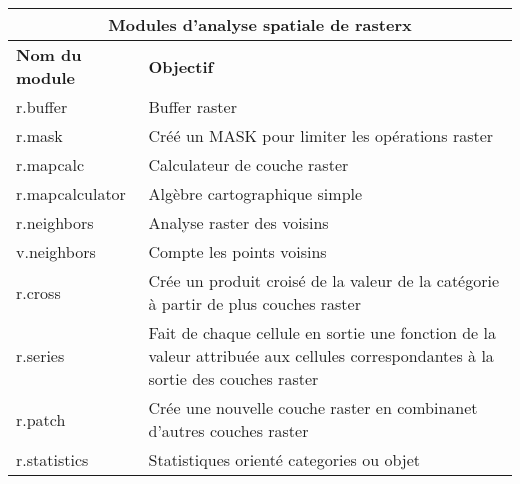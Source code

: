 \begin{table}[H]
\centering
 \begin{tabular}{|p{4cm}|p{10cm}|}
  \hline \multicolumn{2}{|c|}{\textbf{Modules d'analyse spatiale de rasterx}} \\
  \hline \textbf{Nom du module} & \textbf{Objectif} \\
  \hline r.buffer & Buffer raster\\
  \hline r.mask & Créé un MASK pour limiter les opérations raster\\
  \hline r.mapcalc & Calculateur de couche raster \\
  \hline r.mapcalculator & Algèbre cartographique simple \\
  \hline r.neighbors & Analyse raster des voisins\\
  \hline v.neighbors & Compte les points voisins \\
  \hline r.cross & Crée un produit croisé de la valeur de la catégorie à partir de plus couches raster \\
  \hline r.series & Fait de chaque cellule en sortie une fonction de la valeur attribuée aux cellules correspondantes à la sortie des couches raster\\
  \hline r.patch & Crée une nouvelle couche raster en combinanet d'autres couches raster \\
  \hline r.statistics & Statistiques orienté categories ou objet\\

\end{tabular}
\end{table}
